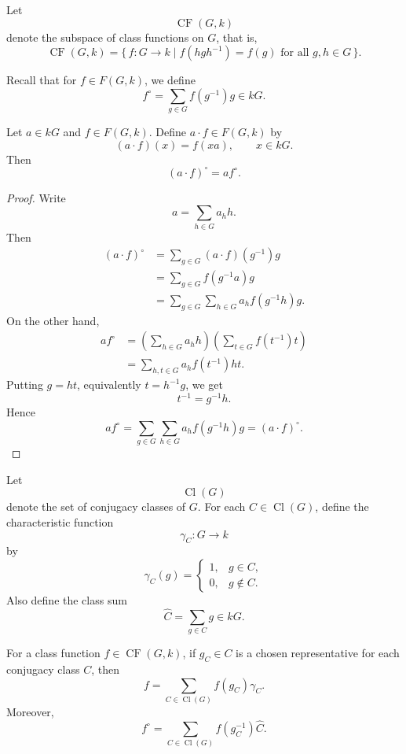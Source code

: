 Let
\[
    \operatorname{CF}(G,k)
\]
denote the subspace of class functions on \(G\), that is,
\[
    \operatorname{CF}(G,k)
    =
    \{\,f:G\to k \mid f(hgh^{-1})=f(g)
    \text{ for all } g,h\in G\,\}.
\]

Recall that for \(f\in F(G,k)\), we define
\[
    f^\circ
    =
    \sum_{g\in G} f(g^{-1})g
    \in kG.
\]

\begin{lemma}
    Let \(a\in kG\) and \(f\in F(G,k)\). Define \(a\cdot f\in F(G,k)\) by
    \[
        (a\cdot f)(x)=f(xa),
        \qquad x\in kG.
    \]
    Then
    \[
        (a\cdot f)^\circ=a f^\circ .
    \]
\end{lemma}

\begin{proof}
    Write
    \[
        a=\sum_{h\in G}a_hh.
    \]
    Then
    \[
        \begin{aligned}
            (a\cdot f)^\circ
             & =\sum_{g\in G}(a\cdot f)(g^{-1})g            \\
             & =\sum_{g\in G}f(g^{-1}a)g                    \\
             & =\sum_{g\in G}\sum_{h\in G}a_h f(g^{-1}h)g .
        \end{aligned}
    \]
    On the other hand,
    \[
        \begin{aligned}
            af^\circ
             & =
            \left(\sum_{h\in G}a_hh\right)
            \left(\sum_{t\in G}f(t^{-1})t\right) \\
             & =
            \sum_{h,t\in G}a_h f(t^{-1})ht.
        \end{aligned}
    \]
    Putting \(g=ht\), equivalently \(t=h^{-1}g\), we get
    \[
        t^{-1}=g^{-1}h.
    \]
    Hence
    \[
        af^\circ
        =
        \sum_{g\in G}\sum_{h\in G}a_h f(g^{-1}h)g
        =
        (a\cdot f)^\circ .
    \]
\end{proof}

Let
\[
    \operatorname{Cl}(G)
\]
denote the set of conjugacy classes of \(G\). For each
\(C\in \operatorname{Cl}(G)\), define the characteristic function
\[
    \gamma_C:G\longrightarrow k
\]
by
\[
    \gamma_C(g)
    =
    \begin{cases}
        1, & g\in C,    \\
        0, & g\notin C.
    \end{cases}
\]
Also define the class sum
\[
    \widehat{C}
    =
    \sum_{g\in C}g
    \in kG.
\]

For a class function \(f\in \operatorname{CF}(G,k)\), if \(g_C\in C\) is a
chosen representative for each conjugacy class \(C\), then
\[
    f
    =
    \sum_{C\in \operatorname{Cl}(G)} f(g_C)\gamma_C.
\]
Moreover,
\[
    f^\circ
    =
    \sum_{C\in \operatorname{Cl}(G)} f(g_C^{-1})\widehat{C}.
\]

